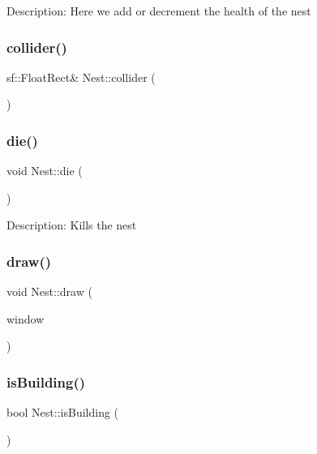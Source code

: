Description\+: Here we add or decrement the health of the nest \mbox{\label{class_nest_a3388bd5cc2dc967a15d842e6c5f21760}} 
\subsubsection{\texorpdfstring{collider()}{collider()}}
{\footnotesize\ttfamily sf\+::\+Float\+Rect\& Nest\+::collider (\begin{DoxyParamCaption}{ }\end{DoxyParamCaption})\hspace{0.3cm}{\ttfamily [inline]}}

\mbox{\label{class_nest_a168e5f70cab698039ea3ceb3ae979ca2}} 
\subsubsection{\texorpdfstring{die()}{die()}}
{\footnotesize\ttfamily void Nest\+::die (\begin{DoxyParamCaption}{ }\end{DoxyParamCaption})}

Description\+: Kills the nest \mbox{\label{class_nest_ac163aeb55369c46b551f6c415c2946c9}} 
\subsubsection{\texorpdfstring{draw()}{draw()}}
{\footnotesize\ttfamily void Nest\+::draw (\begin{DoxyParamCaption}\item[{sf\+::\+Render\+Window \&}]{window }\end{DoxyParamCaption})}

\mbox{\label{class_nest_aa7382d9fa6b7f65bf94dc62d838b193c}} 
\subsubsection{\texorpdfstring{isBuilding()}{isBuilding()}}
{\footnotesize\ttfamily bool Nest\+::is\+Building (\begin{DoxyParamCaption}{ }\end{DoxyParamCaption})\hspace{0.3cm}{\ttfamily [inline]}}

